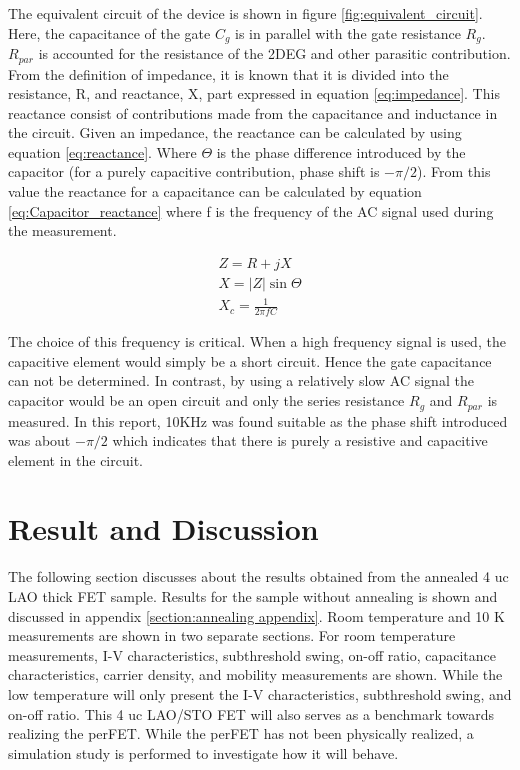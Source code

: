 \documentclass[11pt,a4paper]{report}
\begin{document}
The equivalent circuit of the device is shown in figure \ref{fig:equivalent_circuit}. Here, the capacitance of the gate $C_g$ is in parallel with the gate resistance $R_g$. $R_{par}$ is accounted for the resistance of the 2DEG and other parasitic contribution. From the definition of impedance, it is known that it is divided into the resistance, R, and reactance, X, part expressed in equation \ref{eq:impedance}. This reactance consist of contributions made from the capacitance and inductance in the circuit. Given an impedance, the reactance can be calculated by using equation \ref{eq:reactance}. Where $\Theta$ is the phase difference introduced by the capacitor (for a purely capacitive contribution, phase shift is $-\pi/2$). From this value the reactance for a capacitance can be calculated by equation \ref{eq:Capacitor_reactance} where f is the frequency of the AC signal used during the measurement.

\begin{align}
    Z = R + jX \label{eq:impedance}\\ 
    X = |Z|\sin{\Theta}  \label{eq:reactance}\\
    X_c = \frac{1}{2\pi f C} \label{eq:Capacitor_reactance}
\end{align}

The choice of this frequency is critical. When a high frequency signal is used, the capacitive element would simply be a short circuit. Hence the gate capacitance can not be determined. In contrast, by using a relatively slow AC signal the capacitor would be an open circuit and only the series resistance $R_g$ and $R_{par}$ is measured. In this report, 10KHz was found suitable as the phase shift introduced was about  $-\pi/2$ which indicates that there is purely a resistive and capacitive element in the circuit.




\chapter{Result and Discussion}
The following section discusses about the results obtained from the annealed 4 uc LAO thick FET sample. Results for the sample without annealing is shown and discussed in appendix \ref{section:annealing appendix}. Room temperature and 10 K measurements are shown in two separate sections. For room temperature measurements, I-V characteristics, subthreshold swing, on-off ratio, capacitance characteristics, carrier density, and mobility measurements are shown. While the low temperature will only present the I-V characteristics, subthreshold swing, and on-off ratio. This 4 uc LAO/STO FET will also serves as a benchmark towards realizing the perFET. While the perFET has not been physically realized, a simulation study is performed to investigate how it will behave.
\end{document}

